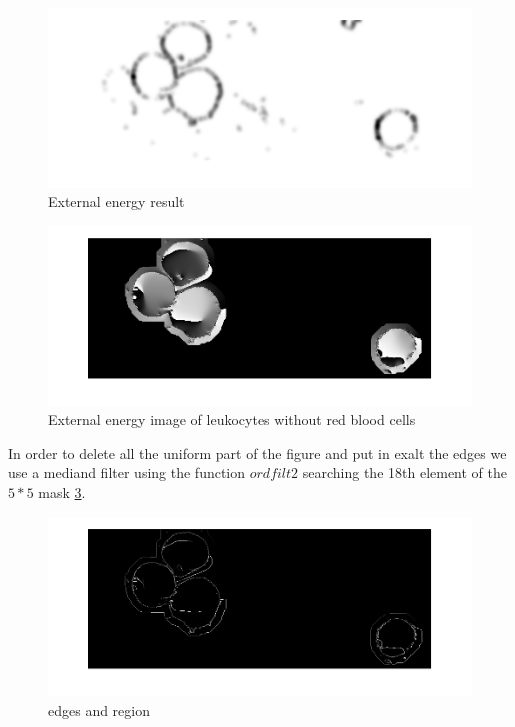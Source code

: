 \begin{figure}
	\begin{center}
		\centering
		\includegraphics[scale=0.5]{img/Eext.png}
		\caption{External energy result}
		\label{fig:Eextforce}
	\end{center}
\end{figure}
\begin{figure}
	\begin{center}
		\centering
		\includegraphics[scale=0.5]{img/onlyleuco.png}
		\caption{External energy image of leukocytes without red blood cells}
		\label{fig:onlyleu}
	\end{center}
\end{figure}
\bigskip

In order to delete all the uniform part of the figure and put in exalt the edges we use a mediand filter using the function $ordfilt2$ searching the 18th element of the $5 * 5$ mask \ref{fig:Pmedonlyleu}.

\begin{figure}
	\begin{center}
		\centering
		\includegraphics[scale=0.5]{img/Pmedonlyleuko.png}
		\caption{edges and region}
		\label{fig:Pmedonlyleu}
	\end{center}
\end{figure}
